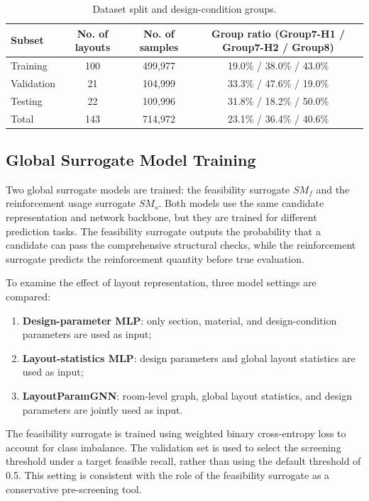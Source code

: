 \begin{table}[t]
\centering
\caption{Dataset split and design-condition groups.}
\label{tab:dataset_split}
\footnotesize
\setlength{\tabcolsep}{6pt}
\begin{tabular}{lccc}
\toprule
Subset & No. of layouts & No. of samples & Group ratio (Group7-H1 / Group7-H2 / Group8) \\
\midrule
Training & 100 & 499,977 & 19.0\% / 38.0\% / 43.0\% \\
Validation & 21 & 104,999 & 33.3\% / 47.6\% / 19.0\% \\
Testing & 22 & 109,996 & 31.8\% / 18.2\% / 50.0\% \\
\midrule
Total & 143 & 714,972 & 23.1\% / 36.4\% / 40.6\% \\
\bottomrule
\end{tabular}
\end{table}

\subsection{Global Surrogate Model Training}
\label{subsec:global_surrogate_training}

Two global surrogate models are trained: the feasibility surrogate $SM_f$ and the reinforcement usage surrogate $SM_s$. Both models use the same candidate representation and network backbone, but they are trained for different prediction tasks. The feasibility surrogate outputs the probability that a candidate can pass the comprehensive structural checks, while the reinforcement surrogate predicts the reinforcement quantity before true evaluation.

To examine the effect of layout representation, three model settings are compared:
\begin{enumerate}
\item \textbf{Design-parameter MLP}: only section, material, and design-condition parameters are used as input;
\item \textbf{Layout-statistics MLP}: design parameters and global layout statistics are used as input;
\item \textbf{LayoutParamGNN}: room-level graph, global layout statistics, and design parameters are jointly used as input.
\end{enumerate}

The feasibility surrogate is trained using weighted binary cross-entropy loss to account for class imbalance. The validation set is used to select the screening threshold under a target feasible recall, rather than using the default threshold of 0.5. This setting is consistent with the role of the feasibility surrogate as a conservative pre-screening tool.

